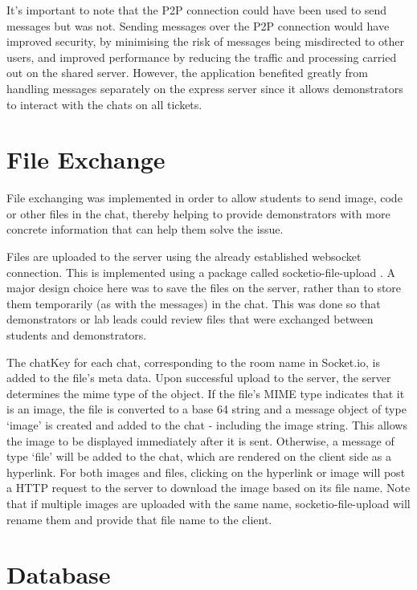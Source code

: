 It's important to note that the P2P connection could have been used to send messages but was not. Sending messages over the P2P connection would have improved security, by minimising the risk of messages being misdirected to other users, and improved performance by reducing the traffic and processing carried out on the shared server. However, the application benefited greatly from handling messages separately on the express server since it allows demonstrators to interact with the chats on all tickets. 

\section{File Exchange}

File exchanging was implemented in order to allow students to send image, code or other files in the chat, thereby helping to provide demonstrators with more concrete information that can help them solve the issue.

Files are uploaded to the server using the already established websocket connection. This is implemented using a package called socketio-file-upload \cite{siofu}. A major design choice here was to save the files on the server, rather than to store them temporarily (as with the messages) in the chat. This was done so that demonstrators or lab leads could review files that were exchanged between students and demonstrators.

The chatKey for each chat, corresponding to the room name in Socket.io, is added to the file's meta data. Upon successful upload to the server, the server determines the \gls{mime} type of the object. If the file's MIME type indicates that it is an image, the file is converted to a base 64 string and a message object of type `image' is created and added to the chat - including the image string. This allows the image to be displayed immediately after it is sent. Otherwise, a message of type `file' will be added to the chat, which are rendered on the client side as a hyperlink. For both images and files, clicking on the hyperlink or image will post a HTTP request to the server to download the image based on its file name. Note that if multiple images are uploaded with the same name, socketio-file-upload will rename them and provide that file name to the client.

\section{Database}

